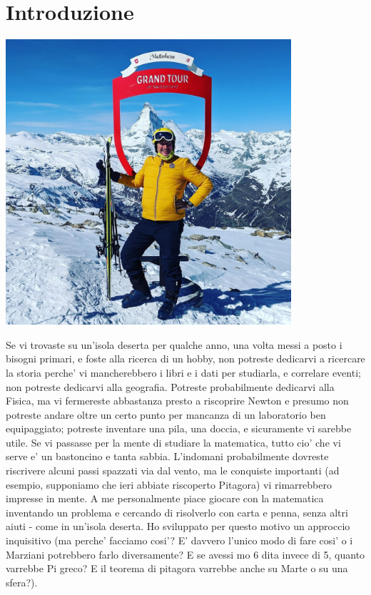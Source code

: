 \label{introduzione}
\chapter{Introduzione}


\includegraphics[height = 300pt, width = 300pt]{images/RiccardoMatterhorn.jpeg}

Se vi trovaste su un'isola deserta per qualche anno, una volta messi a posto i bisogni primari, e foste alla ricerca di un hobby, non potreste dedicarvi a ricercare la storia
perche' vi mancherebbero i libri e i dati per studiarla, e correlare eventi; non potreste dedicarvi alla geografia. Potreste probabilmente dedicarvi alla Fisica, ma vi fermereste
abbastanza presto a riscoprire Newton e presumo non potreste andare oltre un certo punto per mancanza di un laboratorio ben equipaggiato; potreste inventare una pila, una doccia,
e sicuramente vi sarebbe utile. Se vi passasse per la mente di studiare la matematica, tutto cio' che vi serve e' un bastoncino e tanta sabbia. L'indomani probabilmente dovreste
riscrivere alcuni passi spazzati via dal vento, ma le conquiste importanti (ad esempio, supponiamo che ieri abbiate riscoperto Pitagora) vi rimarrebbero impresse in mente.
A me personalmente piace giocare con la matematica inventando un problema e cercando di risolverlo con carta e penna, senza altri aiuti - come in un'isola deserta. Ho sviluppato 
per questo motivo un approccio inquisitivo (ma perche' facciamo cosi'? E' davvero l'unico modo di fare cosi' o i Marziani potrebbero farlo diversamente? E se avessi mo 6 dita
invece di 5, quanto varrebbe Pi greco? E il teorema di pitagora varrebbe anche su Marte o su una sfera?).

